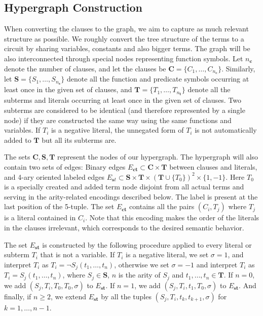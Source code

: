 \documentclass{ecai}
\newcommand{\nbc}[3]{
                {\colorbox{#3}{\bfseries\sffamily\scriptsize\textcolor{white}{#1}}}
                {\textcolor{#3}{\sffamily\small$\blacktriangleright$\textit{#2}$\blacktriangleleft$}}
}
\newcommand{\todoat}[2]{\nbc{TODO: #1}{#2}{todocolor}}
\begin{document}
\subsection{Hypergraph Construction}
\label{hypergraph}
When converting the clauses to the graph, we aim to capture as much relevant structure as possible. We roughly convert the tree structure of the terms to a circuit by sharing variables, constants and also bigger terms. The graph will be also interconnected through special nodes representing function symbols.
Let $n_{\mathbf c}$ denote the number of clauses, and let the clauses be
$\mathbf C = \{C_1, \ldots, C_{n_{\mathbf c}}\}$. Similarly, let
$\mathbf S = \{S_1, \ldots, S_{n_{\mathbf s}}\}$ denote all the function and
predicate symbols occurring at least once in the given set of clauses,
and $\mathbf T = \{T_1, \ldots, T_{n_{\mathbf t}}\}$ denote all the
subterms and literals occurring at least once in the given set of
clauses. Two subterms are considered to be identical (and therefore
represented by a single node) if they are constructed the same way
using the same functions and variables. If $T_i$ is a negative
literal, the unnegated form of $T_i$ is not automatically added to
$\mathbf T$ but all its subterms are.

The sets $\mathbf C, \mathbf S, \mathbf T$ represent the nodes of our
hypergraph. The hypergraph
will also contain two sets of edges: Binary edges
$E_{\mathbf{ct}} \subset \mathbf C\times\mathbf T$ between clauses and
literals, and 4-ary oriented labeled edges 
$E_{\mathbf st} \subset \mathbf S\times\mathbf T\times(\mathbf T\cup\{T_0\})^2\times\{1,-1\}$. 
Here $T_0$ is a specially created and added term node disjoint from all actual terms and serving in the arity-related encodings described below. The label is present at the last position of the 5-tuple. 
The set $E_{\mathbf{ct}}$ contains all
the pairs $(C_i, T_j)$ where $T_j$ is a literal contained in $C_i$. Note that this encoding makes the order of the literals in the clauses irrelevant, which corresponds to the desired semantic behavior.

The set $E_{\mathbf{st}}$ is constructed by the following
procedure applied to every
literal or subterm $T_i$ that is not a variable. If $T_i$ is a
negative literal, we set $\sigma = 1$, and interpret $T_i$ as
$T_i = \neg S_j(t_1,\ldots,t_n)$, otherwise we set $\sigma = -1$
and interpret $T_i$ as $T_i = S_j(t_1,\ldots,t_n)$, where $S_j\in\mathbf S$,  $n$ is the arity of $S_j$ and
$t_1,\ldots,t_n\in\mathbf T$. If $n=0$, we add 
$(S_j,T_i,T_{0},T_{0},\sigma)$ to $E_{\mathbf{st}}$. If
$n=1$, we add $(S_j,T_i,t_1,T_{0},\sigma)$ to $E_{\mathbf{st}}$.
And finally, if $n\geq 2$, we extend $E_{\mathbf{st}}$ by
all the tuples $(S_j,T_i,t_k,t_{k+1},\sigma)$ for $k=1,\ldots,n-1$.
\end{document}
